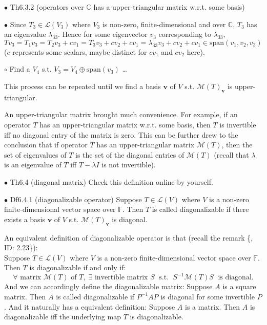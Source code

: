 \documentclass{article}
\begin{document}
\begin{Th}{$\bullet$ Th6.3.2 (operators over $\mathbb{C}$ has a upper-triangular matrix w.r.t. some basis)}
\begin{compactenum}
        \item[$\bullet$] Since $T_3\in\mathcal{L}(V_3)$ where $V_3$ is non-zero, finite-dimensional and over $\mathbb{C}$, $T_3$ has an eigenvalue $\lambda_{33}$. Hence for some eigenvector $v_3$ corresponding to $\lambda_{33}$, $Tv_3 = T_1v_3 = T_2v_3 + cv_1 = T_3v_3 + cv_2 + cv_1 = \lambda_{33}v_3 + cv_2 + cv_1 \in\text{span}(v_1, v_2, v_3)$ ($c$ represents some scalars, maybe distinct for $cv_1$ and $cv_2$ here).
        \item[$\circ$] Find a $V_4$ s.t. $V_3 = V_4 \oplus \text{span}(v_3)$ \dots 
    \end{compactenum}
    This process can be repeated until we find a basis $\pmb{v}$ of $V$ s.t. $\mathcal{M}(T)_{\pmb{v}}$ is upper-triangular.
\end{Th}

\begin{Rmk}{}
    An upper-triangular matrix brought much convenience. For example, \textcolor{Th}{if an operator $T$ has an upper-triangular matrix w.r.t. some basis, then $T$ is invertible iff no diagonal entry of the matrix is zero}. This can be further drew to the conclusion that \textcolor{Th}{if operator $T$ has an upper-triangular matrix $\mathcal{M}(T)$, then the set of eigenvalues of $T$ is the set of the diagonal entries of $\mathcal{M}(T)$ (recall that $\lambda$ is an eigenvalue of $T$ iff $T-\lambda I$ is not invertible).}
\end{Rmk}

\begin{Df}{$\bullet$ Th6.4 (diagonal matrix)}
    Check this definition online by yourself.
\end{Df}

\begin{Df}{$\bullet$ Df6.4.1 (diagonalizable operator)}
    Suppose $T\in\mathcal{L}(V)$ where $V$ is a non-zero finite-dimensional vector space over $\mathbb{F}$. Then $T$ is called diagonalizable if there exists a basis $\pmb{v}$ of $V$ s.t. $\mathcal{M}(T)_{\pmb{v}}$ is diagonal.
\end{Df}

\begin{Rmk}{}
    An equivalent definition of diagonalizable operator is that (recall the remark \{, ID: 2.23\}):\\
    \textcolor{Th}{Suppose $T\in\mathcal{L}(V)$ where $V$ is a non-zero finite-dimensional vector space over $\mathbb{F}$. Then $T$ is diagonalizable if and only if:
    $$\forall \text{ matrix } \mathcal{M}(T)\text{ of } T, \;\exists \text{ invertible matrix } S \;\text{ s.t. }\; S^{-1}\mathcal{M}(T)S \;\text{ is diagonal.}$$}
    And we can accordingly define the diagonalizable matrix: 
    \textcolor{Df}{Suppose $A$ is a square matrix. Then $A$ is called diagonalizable if $P^{-1}AP$ is diagonal for some invertible $P$.}
    And it naturally has a equivalent definition: \textcolor{Th}{Suppose $A$ is a matrix. Then $A$ is diagonalizable iff the underlying map $T$ is diagonalizable.}
\end{Rmk}
\end{document}
